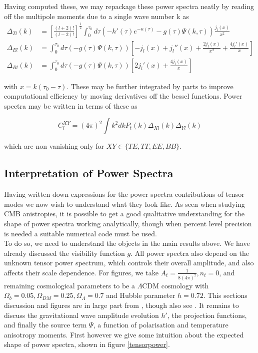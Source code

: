 \documentclass[a4paper,10pt]{article}
\newcommand{\half}{\frac{1}{2}}
\newcommand{\ltwo}{\left[\frac{(l+2)!}{(l-2)!}\right]}
\begin{document}
Having computed these, we may repackage these power spectra neatly by reading off the multipole moments due to a single wave number k as 
\begin{equation}
\begin{split}
\Delta_{Tl}(k) &= \ltwo^\half \int_0^{\tau_0} d\tau \left(-h'(\tau)e^{-\kappa(\tau)}-g(\tau)\Psi(k,\tau)\right)\frac{j_l(x)}{x^2}\\
\Delta_{El}(k) &= \int_0^{\tau_0}d\tau  \left(-g(\tau)\Psi(k,\tau)\right)\left[-j_l(x) +j_l''(x)+\frac{2j_l(x)}{x^2} + \frac{4j_l'(x)}{x}\right]\\
\Delta_{Bl}(k) &= \int_0^{\tau_0} d\tau \left(-g(\tau)\Psi(k,\tau)\right)\left[2j_l'(x)+\frac{4j_l(x)}{x}\right]
\end{split}
\end{equation}
 
with $x=k(\tau_0-\tau)$. These may be further integrated by parts to improve computational efficiency by moving derivatives off the bessel functions. Power spectra may be written in terms of these as 

\begin{equation}
C_l^{XY} = (4\pi)^2 \int k^2 dk P_t(k) \Delta_{Xl}(k)\Delta_{Yl}(k)
\end{equation}

which are non vanishing only for $XY \in \{TE, TT, EE, BB\}$. 

\subsection{Interpretation of Power Spectra}
\label{interpretation}

Having written down expressions for the power spectra contributions of tensor modes we now wish to understand what they look like. As seen when studying CMB anistropies, it is possible to get a good qualitative understanding for the shape of power spectra working analytically, though when percent level precision is needed a suitable numerical code must be used.\\

To do so, we need to understand the objects in the main results above. We have already discussed the visibility function $g$. All power spectra also depend on the unknown tensor power spectrum, which controls their overall amplitude, and also affects their scale dependence. For figures, we take  $A_t = \frac{1}{8(4\pi)^2}, n_t=0$, and remaining cosmological parameters to be a $\Lambda$CDM cosmology with $\Omega_b=0.05, \Omega_{DM}=0.25, \Omega_\Lambda=0.7$ and Hubble parameter $h=0.72$. This sections discussion and figures are in large part from \cite{Pritchard}, though also see \cite{zhao}. It remains to discuss the gravitational wave amplitude evolution $h'$, the projection functions, and finally the source term $\Psi$, a function of polarisation and temperature anisotropy moments. First however we give some intuition about the expected shape of power spectra, shown in figure \ref{tensorpower}.
\end{document}
